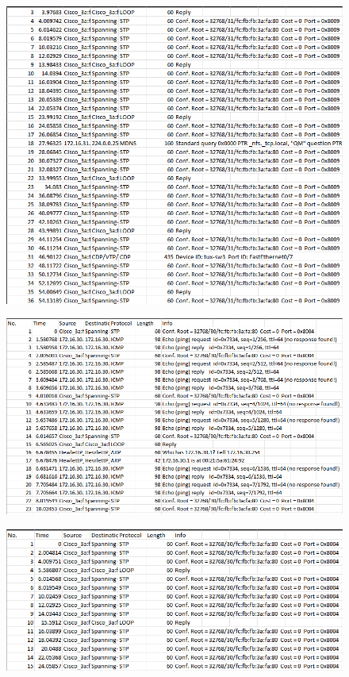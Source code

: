\documentclass[a4paper,11pt,english]{article}
\begin{document}
        \begin{figure}[H]
            \centering
            \includegraphics[scale=0.6]{./imgs/exp2-tux32-step73.png}
        \end{figure}

        \begin{figure}[H]
            \centering
            \includegraphics[scale=0.6]{./imgs/exp2-tux33-step7.png}
        \end{figure}

        \begin{figure}[H]
            \centering
            \includegraphics[scale=0.6]{./imgs/exp2-tux33-step72.png}
        \end{figure}
\end{document}
